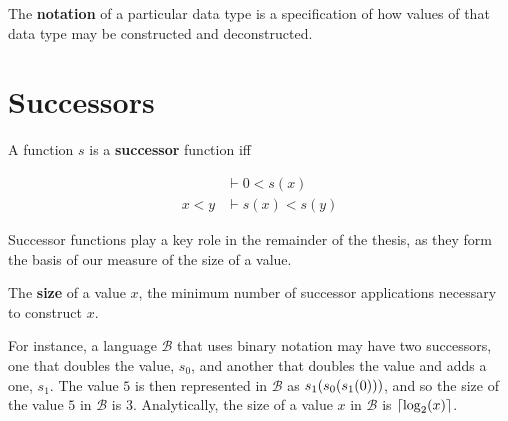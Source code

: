 

\begin{definition}

The \textbf{notation} of a particular data type is a specification of how
values of that data type may be constructed and deconstructed.

\end{definition}

\section{Successors}





\begin{definition}

A function $s$ is a \textbf{successor} function iff

\begin{align}
&\vdash 0 < s(x) \\
x < y &\vdash s(x) < s(y)
\end{align}

\end{definition}

Successor functions play a key role in the remainder of the thesis, as they
form the basis of our measure of the size of a value.

\begin{definition}

The \textbf{size} of a value $x$, the minimum number of successor applications
necessary to construct $x$.

\end{definition}

For instance, a language $\mathcal{B}$ that uses binary notation may have two
successors, one that doubles the value, $s_0$, and another that doubles the
value and adds a one, $s_1$. The value $5$ is then represented in $\mathcal{B}$
as $s_1\mathopen{}\left({s_0\mathopen{}\left({s_1\mathopen{}\left({0}\right)\mathclose{}}\right)\mathclose{}}\right)\mathclose{}$, and so the size of the value $5$ in $\mathcal{B}$
is $3$. Analytically, the size of a value $x$ in $\mathcal{B}$ is
$\mathopen{}\left\lceil{\log_2\ensuremath{\mathopen{}\left({x}\right)\mathclose{}}}\right\rceil\mathclose{}$.

